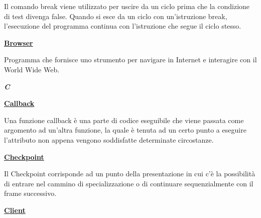\medskip
\begin{addmargin}[5em]{1em}	
Il comando break viene utilizzato per uscire da un ciclo prima che la condizione di test divenga false. Quando si esce da un ciclo con un’istruzione break, l’esecuzione del programma continua con l’istruzione che segue il ciclo stesso.
\end{addmargin}

\bigskip
\begin{addmargin}[0em]{0em}	
	\textbf{\underline{Browser}}
\end{addmargin}
	
\medskip
\begin{addmargin}[5em]{1em}	
Programma che fornisce uno strumento per navigare in Internet e interagire con il World Wide Web.
\end{addmargin}

\newpage

\cleardoublepage
{}
{}
\noindent\hrulefill\hspace{4mm}\textbf{\textsl{\Huge{C}}}\hspace{4mm}\hrulefill

\vspace*{2\bigskipamount}

\begin{addmargin}[0em]{0em}
	\textbf{\underline{Callback}}
\end{addmargin}

\medskip
\begin{addmargin}[5em]{1em}
	Una funzione callback è una parte di codice eseguibile che viene passata come argomento ad un'altra funzione, la quale è tenuta ad un certo punto a eseguire l'attributo non appena vengono soddisfatte determinate circostanze.
\end{addmargin}		

\bigskip
\begin{addmargin}[0em]{0em}
	\textbf{\underline{Checkpoint}}
\end{addmargin}

\medskip
\begin{addmargin}[5em]{1em}
	Il Checkpoint corrisponde ad un punto della presentazione in cui c'è la possibilità di entrare nel cammino di specializzazione o di continuare sequenzialmente con il frame successivo.  	
\end{addmargin}	

\bigskip
\begin{addmargin}[0em]{0em}
	\textbf{\underline{Client}}
\end{addmargin}

